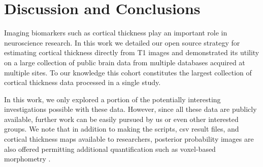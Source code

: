 \section{Discussion and Conclusions}

Imaging biomarkers such as cortical thickness play an 
important role in neuroscience research.  In this work we 
detailed our open source strategy for estimating
cortical thickness directly from T1 images and demonstrated
its utility on a large collection of public brain data from
multiple databases acquired at multiple sites.  To our knowledge
this cohort constitutes the largest collection of cortical
thickness data processed in a single study.  

In this work, we only explored a portion of the potentially
interesting investigations possible with these data.  However,
since all these data are publicly available, further work can
be easily pursued by us or even other interested groups.  We 
note that in addition to making the scripts, csv result files,
and cortical thickness maps available to researchers, 
posterior probability images are also offered permitting additional
quantification such as voxel-based morphometry \cite{ashburner2000}.
